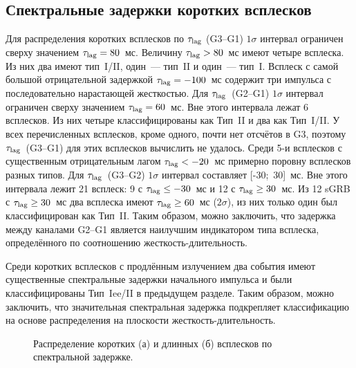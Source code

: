 \subsection{Спектральные задержки коротких всплесков}
Для распределения коротких всплесков по $\tau_{\mathrm{lag}}$ (G3--G1) $1\sigma$ 
интервал ограничен сверху значением $\tau_{\mathrm{lag}}=80$~мс.     
Величину $\tau_{\mathrm{lag}} > 80$~мс  имеют четыре всплеска. 
Из них два имеют тип~I/II, один~--- тип~II и один~--- тип~I. 
Всплеск с самой большой отрицательной задержкой $\tau_{\mathrm{lag}}=-100$~мс содержит три 
импульса с последовательно нарастающей жесткостью. 
Для $\tau_{\mathrm{lag}}$~(G2--G1) $1\sigma$ интервал ограничен сверху значением 
$\tau_{{\mathrm{lag}}}=60$~мс. Вне этого интервала лежат 6 всплесков. 
Из них четыре классифицированы как Тип~II и два как Тип~I/II. 
У всех перечисленных всплесков, кроме одного, почти нет отсчётов в G3, поэтому 
$\tau_{{\mathrm{lag}}}$~(G3--G1) для этих всплесков вычислить не удалось. 
Среди 5-и всплесков с существенным отрицательным лагом 
$\tau_{{\mathrm{lag}}} <-20$~мс примерно поровну всплесков разных типов.
Для $\tau_{\mathrm{lag}}$~(G3--G2) $1\sigma$ интервал составляет [-30;~30]~мс. 
Вне этого интервала лежит 21 всплеск: 9 с $\tau_{\mathrm{lag}} \leq -30$~мс и 
12 с $\tau_{\mathrm{lag}} \geq 30$~мс. 
Из 12 sGRB с $\tau_{\mathrm{lag}}\geq 30$~мс два всплеска имеют  $\tau_{\mathrm{lag}} \geq 60$~мс ($2\sigma$), 
из них только один был классифицирован как Тип~II. 
Таким образом, можно заключить, что задержка между каналами G2--G1 является наилучшим 
индикатором типа всплеска, определённого по соотношению жесткость-длительность.

Среди коротких всплесков с продлённым излучением два события имеют существенные  %
спектральные задержки начального импульса и были классифицированы Тип~Iee/II в предыдущем разделе. Таким образом, 
можно заключить, что значительная спектральная задержка подкрепляет классификацию 
на основе распределения на плоскости жесткость-длительность.



\begin{figure}[h]
  \begin{minipage}[h]{0.5\textwidth}
  \end{minipage}
  \hfill
  \begin{minipage}[h]{0.5\textwidth}
  \end{minipage}
  \caption{Распределение коротких (а) и длинных (б) всплесков по спектральной задержке.}
  \label{img:LagDistrs}  
\end{figure}

